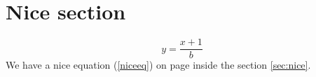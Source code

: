 \documentclass{article}
\numberwithin{equation}{section} %
\begin{document}
    \section{Nice section \label{sec:nice}}
    \begin{equation}
         y=\frac{x+1}{b} \label{niceeq}
    \end{equation}
    We have a nice equation (\ref{niceeq}) on page \pageref{niceeq} inside the section \ref{sec:nice}.
\end{document}
